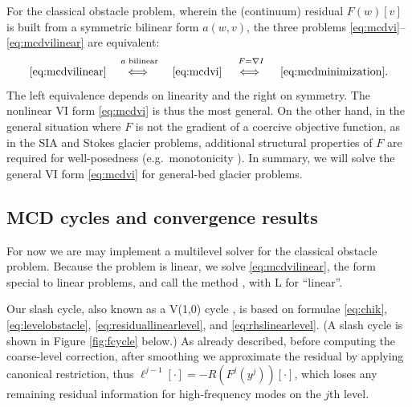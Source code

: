 \documentclass[letterpaper,final,12pt,reqno]{amsart}
\theoremstyle{claim}
\newcommand{\grad}{\nabla}
\numberwithin{equation}{section}
\numberwithin{figure}{section}
\numberwithin{table}{section}
\numberwithin{theorem}{section}
\begin{document}
For the classical obstacle problem, wherein the (continuum) residual $F(w)[v]$ is built from a symmetric bilinear form $a(w,v)$, the three problems \eqref{eq:mcdvi}--\eqref{eq:mcdvilinear} are equivalent:
   $$\eqref{eq:mcdvilinear} \quad \stackrel{a \text{ bilinear}}{\iff\strut} \quad \eqref{eq:mcdvi} \quad \stackrel{F=\grad I}{\iff\strut} \quad \eqref{eq:mcdminimization}.$$
The left equivalence depends on linearity and the right on symmetry.  The nonlinear VI form \eqref{eq:mcdvi} is thus the most general.  On the other hand, in the general situation where $F$ is not the gradient of a coercive objective function, as in the SIA and Stokes glacier problems, additional structural properties of $F$ are required for well-posedness (e.g.~monotonicity \cite{Bueler2020,JouvetBueler2012,KinderlehrerStampacchia1980}).  In summary, we will solve the general VI form \eqref{eq:mcdvi} for general-bed glacier problems.

\subsection*{MCD cycles and convergence results}  For now we are may implement a multilevel solver for the classical obstacle problem.  Because the problem is linear, we solve  \eqref{eq:mcdvilinear}, the form special to linear problems, and call the method , with L for ``linear''.

Our slash cycle, also known as a V(1,0) cycle \cite{GraeserKornhuber2009}, is based on formulae \eqref{eq:chik}, \eqref{eq:levelobstacle}, \eqref{eq:residuallinearlevel}, and \eqref{eq:rhslinearlevel}.  (A slash cycle is shown in Figure \ref{fig:fcycle} below.)  As already described, before computing the coarse-level correction, after smoothing we approximate the residual by applying canonical restriction, thus $\ell^{j-1}[\cdot] = - R(F^j(y^j))[\cdot]$, which loses any remaining residual information for high-frequency modes on the $j$th level.
\end{document}

